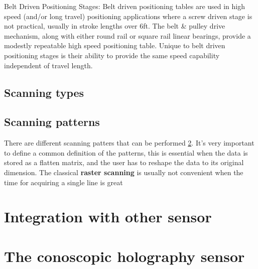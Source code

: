 Belt Driven Positioning Stages:
Belt driven positioning tables are used in high speed (and/or long travel) positioning applications where a screw driven stage is not practical, usually in stroke lengths over 6ft. The belt & pulley drive mechanism, along with either round rail or square rail linear bearings, provide a modestly repeatable high speed positioning table. Unique to belt driven positioning stages is their ability to provide the same speed capability independent of travel length.
\subsection{Scanning types}


\subsection{Scanning patterns}
There are different scanning patters that can be performed \ref{}. It's very important to define a common definition of the patterns, this is essential when the data is stored as a flatten matrix, and the user has to reshape the data to its original dimension. The classical \textbf{raster scanning} is usually not convenient when the time for acquiring a single line is great
\section{Integration with other sensor}

\section{The conoscopic holography sensor}